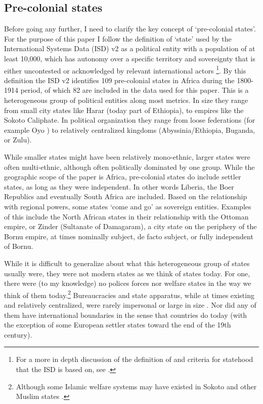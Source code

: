 \documentclass[12pt]{article}
\begin{document}
\subsection{Pre-colonial states} \label{Pre-colonial states}

Before going any further, I need to clarify the key concept of `pre-colonial
states'. For the purpose of this paper I follow the definition of `state' used
by the International Systems Data (ISD) v2 \citep{Butcher2020} as a political
entity with a population of at least 10,000, which has autonomy over a specific
territory and sovereignty that is either uncontested or acknowledged by relevant
international actors \citep{Butcher2020}\footnote{For a more in depth discussion
	of the definition of and criteria for statehood that the ISD is based
on, see \citet{Butcher2017}.}. By this definition the ISD v2 identifies 109
pre-colonial states in Africa during the 1800-1914 period, of which 82 are
included in the data used for this paper. This is a heterogeneous group of
political entities along most metrics. In size they range from small city states
like Harar (today part of Ethiopia), to empires like the Sokoto Caliphate. In
political organization they range from loose federations (for example Oyo
\citep{Law1977}) to relatively centralized kingdoms (Abyssinia/Ethiopia,
Buganda, or Zulu).

While smaller states might have been relatively mono-ethnic, larger states were
often multi-ethnic, although often politically dominated by one group. While the
geographic scope of the paper is Africa, pre-colonial states do include settler
states, as long as they were independent. In other words Liberia, the Boer
Republics and eventually South Africa are included. Based on the relationship
with regional powers, some states `come and go' as sovereign entities. Examples
of this include the North African states in their relationship with the Ottoman
empire, or Zinder (Sultanate of Damagaram), a city state on the periphery of the
Bornu empire, at times nominally subject, de facto subject, or fully independent
of Bornu.

While it is difficult to generalize about what this heterogeneous group of
states usually were, they were not modern states as we think of states today.
For one, there were (to my knowledge) no polices forces nor welfare states in
the way we think of them today.\footnote{Although some Islamic welfare systems
may have existed in Sokoto \citep{Buba_2018} and other Muslim states
\citep{WeissHolger2002SwiM}.} Bureaucracies and state apparatus, while at times
existing and relatively centralized, were rarely impersonal or large in size
\citep{Herbst2014}. Nor did any of them have international boundaries in the
sense that countries do today (with the exception of some European settler
states toward the end of the 19th century). 
\end{document}
